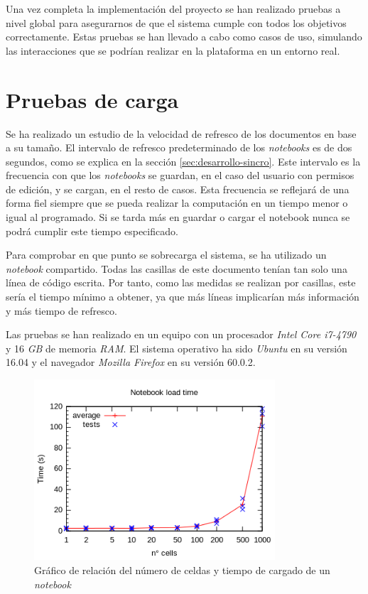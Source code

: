 \documentclass[11pt,spanish,listoffigures]{tfgetsinf}
\begin{document}
Una vez completa la implementación del proyecto se han realizado pruebas a nivel global para asegurarnos de que el sistema cumple con todos los objetivos correctamente. Estas pruebas se han llevado a cabo como casos de uso, simulando las interacciones que se podrían realizar en la plataforma en un entorno real.



\section{Pruebas de carga}
\label{sec:pruebas de carga}

Se ha realizado un estudio de la velocidad de refresco de los documentos en base a su tamaño. El intervalo de refresco predeterminado de los \textit{notebooks} es de dos segundos, como se explica en la sección \ref{sec:desarrollo-sincro}. Este intervalo es la frecuencia con que los \textit{notebooks} se guardan, en el caso del usuario con permisos de edición, y se cargan, en el resto de casos. Esta frecuencia se reflejará de una forma fiel siempre que se pueda realizar la computación en un tiempo menor o igual al programado. Si se tarda más en guardar o cargar el notebook nunca se podrá cumplir este tiempo especificado.

Para comprobar en que punto se sobrecarga el sistema, se ha utilizado un \textit{notebook} compartido. Todas las casillas de este documento tenían tan solo una línea de código escrita. Por tanto, como las medidas se realizan por casillas, este sería el tiempo mínimo a obtener, ya que más líneas implicarían más información y más tiempo de refresco. 

Las pruebas se han realizado en un equipo con un procesador \textit{Intel Core i7-4790} y 16 \textit{GB} de memoria \textit{RAM}. El sistema operativo ha sido \textit{Ubuntu} en su versión 16.04 y el navegador \textit{Mozilla Firefox} en su versión 60.0.2.

\begin{figure}[H]
	\centering
  	\includegraphics[width=0.8\textwidth]{loadplot.png}
  	\caption{Gráfico de relación del número de celdas y tiempo de cargado de un \textit{notebook}}
  	\label{fig:loadplot}
\end{figure}
\end{document}
